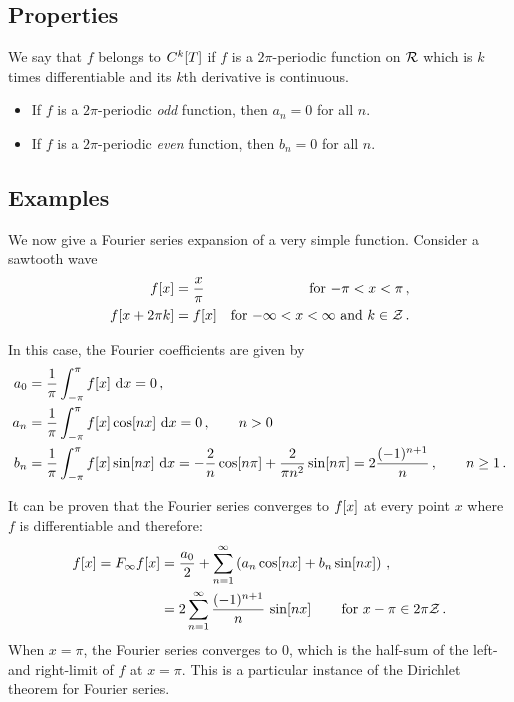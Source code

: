 \subsection{Properties}
We say that $f$ belongs to $C^k\!\left[{T}\right]$ if $f$ is a $2\pi$-periodic function on $\mathcal{R}$ which is $k$ times differentiable and its $k$th derivative is continuous.
\begin{itemize}
\item If $f$ is a $2\pi$-periodic \emph{odd} function, then $a_n = 0$ for all $n$.
\item If $f$ is a $2\pi$-periodic \emph{even} function, then $b_n = 0$ for all $n$.
\end{itemize}


\subsection{Examples}
We now give a Fourier series expansion of a very simple function. Consider a sawtooth wave
\begin{align*}
          f\!\left[{x}\right] &= \dfrac{x}{\pi}&\text{for $-\pi < x < \pi$\,,}\\
f\!\left[{x + 2\pi k}\right] &= f\!\left[{x}\right]       &\text{for $-\infty < x < \infty$ and $k\in\mathcal{Z}$\,.}
\end{align*}

In this case, the Fourier coefficients are given by
\begin{align*}
a_0 &= \dfrac{1}{\pi}\int_{-\pi}^{\pi}f\!\left[{x}\right]\,\text{d} x = 0\,,\\
a_n &= \dfrac{1}{\pi}\int_{-\pi}^{\pi}f\!\left[{x}\right]\cos\!\left[{nx}\right]\,\text{d} x = 0\,,\qquad n > 0\\
b_n &= \dfrac{1}{\pi}\int_{-\pi}^{\pi}f\!\left[{x}\right]\sin\!\left[{nx}\right]\,\text{d} x 
     = -\dfrac{2}{n}\cos\!\left[{n\pi}\right] + \dfrac{2}{\pi n^2}\sin\!\left[{n\pi}\right]
     = 2\dfrac{(-1)^{n+1}}{n}\,,\qquad n\geq 1\,.
\end{align*}

It can be proven that the Fourier series converges to $f\!\left[{x}\right]$ at every point $x$ where $f$ is differentiable and therefore:
\begin{align*}
f\!\left[{x}\right] = F_{\infty}{f}\!\left[{x}\right] &= \dfrac{a_0}{2} 
                          + \sum_{n = 1}^{\infty} \left( a_n\cos\!\left[{nx}\right] + b_n\sin\!\left[{nx}\right] \right)\,,\\
                      &= 2\sum_{n = 1}^{\infty} \dfrac{(-1)^{n+1}}{n}\,\sin\!\left[{nx}\right]\qquad
                          \text{for $x-\pi\in 2\pi\mathcal{Z}$\,.}
\end{align*}
When $x = \pi$, the Fourier series converges to 0, which is the half-sum of the left- and right-limit of $f$ at $x = \pi$. This is a particular instance of the Dirichlet theorem for Fourier series.

